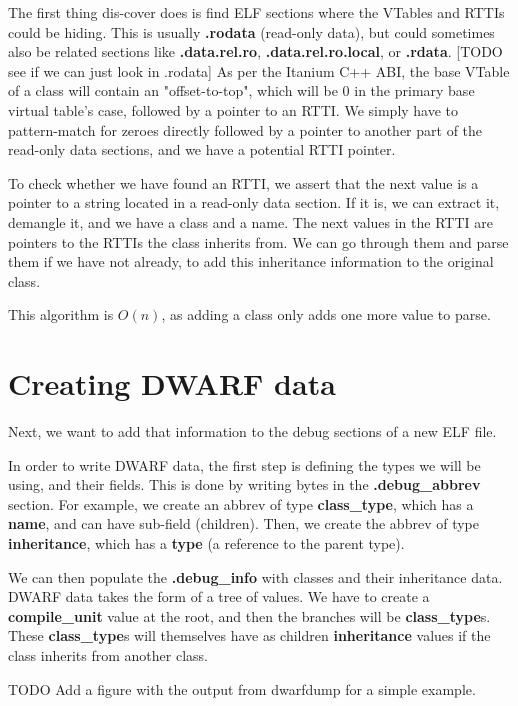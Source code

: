 \documentclass[a4paper,11pt,oneside]{report}
\begin{document}
The first thing dis-cover does is find ELF sections where the VTables and RTTIs could be hiding.
This is usually \textbf{.rodata} (read-only data), but could sometimes also be related sections like \textbf{.data.rel.ro}, \textbf{.data.rel.ro.local}, or \textbf{.rdata}.
[TODO see if we can just look in .rodata]
As per the Itanium C++ ABI, the base VTable of a class will contain an "offset-to-top", which will be 0 in the primary base virtual table's case, followed by a pointer to an RTTI.
We simply have to pattern-match for zeroes directly followed by a pointer to another part of the read-only data sections, and we have a potential RTTI pointer.

To check whether we have found an RTTI, we assert that the next value is a pointer to a string located in a read-only data section.
If it is, we can extract it, demangle it, and we have a class and a name.
The next values in the RTTI are pointers to the RTTIs the class inherits from.
We can go through them and parse them if we have not already, to add this inheritance information to the original class.

This algorithm is $O(n)$, as adding a class only adds one more value to parse.

\section{Creating DWARF data}

Next, we want to add that information to the debug sections of a new ELF file.

In order to write DWARF data, the first step is defining the types we will be using, and their fields.
This is done by writing bytes in the \textbf{.debug\_abbrev} section.
For example, we create an abbrev of type \textbf{class\_type}, which has a \textbf{name}, and can have sub-field (children).
Then, we create the abbrev of type \textbf{inheritance}, which has a \textbf{type} (a reference to the parent type).

We can then populate the \textbf{.debug\_info} with classes and their inheritance data.
DWARF data takes the form of a tree of values. We have to create a \textbf{compile\_unit} value at the root, and then the branches will be \textbf{class\_type}s.
These \textbf{class\_type}s will themselves have as children \textbf{inheritance} values if the class inherits from another class.

TODO Add a figure with the output from dwarfdump for a simple example.
\end{document}

